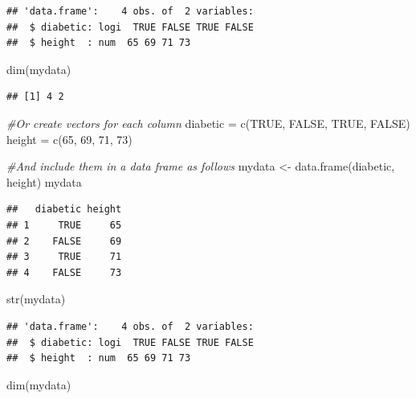 \documentclass[
]{book}
\newenvironment{Shaded}{\begin{snugshade}}{\end{snugshade}}
\newcommand{\CommentTok}[1]{\textcolor[rgb]{0.56,0.35,0.01}{\textit{#1}}}
\newcommand{\ConstantTok}[1]{\textcolor[rgb]{0.00,0.00,0.00}{#1}}
\newcommand{\DecValTok}[1]{\textcolor[rgb]{0.00,0.00,0.81}{#1}}
\newcommand{\FunctionTok}[1]{\textcolor[rgb]{0.00,0.00,0.00}{#1}}
\newcommand{\NormalTok}[1]{#1}
\newcommand{\OtherTok}[1]{\textcolor[rgb]{0.56,0.35,0.01}{#1}}
\begin{document}
\begin{verbatim}
## 'data.frame':    4 obs. of  2 variables:
##  $ diabetic: logi  TRUE FALSE TRUE FALSE
##  $ height  : num  65 69 71 73
\end{verbatim}

\begin{Shaded}
\begin{Highlighting}[]
\FunctionTok{dim}\NormalTok{(mydata)}
\end{Highlighting}
\end{Shaded}

\begin{verbatim}
## [1] 4 2
\end{verbatim}

\begin{Shaded}
\begin{Highlighting}[]
\CommentTok{\#Or create vectors for each column}
\NormalTok{diabetic }\OtherTok{=} \FunctionTok{c}\NormalTok{(}\ConstantTok{TRUE}\NormalTok{, }\ConstantTok{FALSE}\NormalTok{, }\ConstantTok{TRUE}\NormalTok{, }\ConstantTok{FALSE}\NormalTok{)}
\NormalTok{height }\OtherTok{=} \FunctionTok{c}\NormalTok{(}\DecValTok{65}\NormalTok{, }\DecValTok{69}\NormalTok{, }\DecValTok{71}\NormalTok{, }\DecValTok{73}\NormalTok{)}

\CommentTok{\#And include them in a data frame as follows}
\NormalTok{mydata }\OtherTok{\textless{}{-}} \FunctionTok{data.frame}\NormalTok{(diabetic, height)}
\NormalTok{mydata}
\end{Highlighting}
\end{Shaded}

\begin{verbatim}
##   diabetic height
## 1     TRUE     65
## 2    FALSE     69
## 3     TRUE     71
## 4    FALSE     73
\end{verbatim}

\begin{Shaded}
\begin{Highlighting}[]
\FunctionTok{str}\NormalTok{(mydata)}
\end{Highlighting}
\end{Shaded}

\begin{verbatim}
## 'data.frame':    4 obs. of  2 variables:
##  $ diabetic: logi  TRUE FALSE TRUE FALSE
##  $ height  : num  65 69 71 73
\end{verbatim}

\begin{Shaded}
\begin{Highlighting}[]
\FunctionTok{dim}\NormalTok{(mydata)}
\end{Highlighting}
\end{Shaded}
\end{document}
